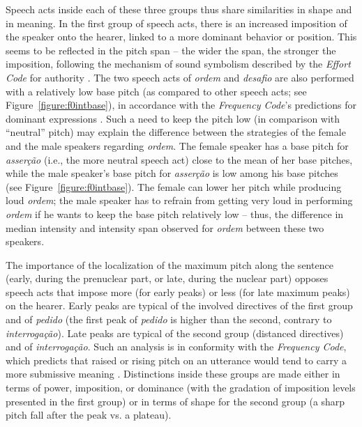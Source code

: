 \documentclass[output=paper]{LSP/langsci}
\begin{document}
Speech acts inside each of these three groups thus share similarities in shape and in meaning. 
In the first group of speech acts, there is an increased imposition of the speaker onto the hearer, linked to a more dominant behavior or position. 
This seems to be reflected in the pitch span -- the wider the span, the stronger the imposition, following the mechanism of sound symbolism described by the \textit{Effort Code} for authority \citep{Gussenhoven2004}. 
The two speech acts of \textit{ordem} and \textit{desafio} are also performed with a relatively low base pitch (as compared to other speech acts; see Figure~\ref{figure:f0intbase}), in accordance with the \textit{Frequency Code}'s predictions for dominant expressions \citep{ohala1994symbolism}. 
Such a need to keep the pitch low (in comparison with ``neutral'' pitch) may explain the difference between the strategies of the female and the male speakers regarding \textit{ordem}. 
The female speaker has a base pitch for \textit{asserção} (i.e., the more neutral speech act) close to the mean of her base pitches, while the male speaker's base pitch for \textit{asserção} is low among his base pitches (see Figure~\ref{figure:f0intbase}). 
The female can lower her pitch while producing loud \textit{ordem}; the male speaker has to refrain from getting very loud in performing \textit{ordem} if he wants to keep the base pitch relatively low -- thus, the difference in median intensity and intensity span observed for \textit{ordem} between these two speakers.

The importance of the localization of the maximum pitch along the sentence (early, during the prenuclear part, or late, during the nuclear part) opposes speech acts that impose more (for early peaks) or less (for late maximum peaks) on the hearer. 
Early peaks are typical of the involved directives of the first group and of \textit{pedido} (the first peak of \textit{pedido} is higher than the second, contrary to \textit{interrogação}). 
Late peaks are typical of the second group (distanced directives) and of \textit{interrogação}. 
Such an analysis is in conformity with the \textit{Frequency Code}, which predicts that raised or rising pitch on an utterance would tend to carry a more submissive meaning \citep{ohala1994symbolism}. 
Distinctions inside these groups are made either in terms of power, imposition, or dominance (with the gradation of imposition levels presented in the first group) or in terms of shape for the second group (a sharp pitch fall after the peak vs. a plateau).
\end{document}
